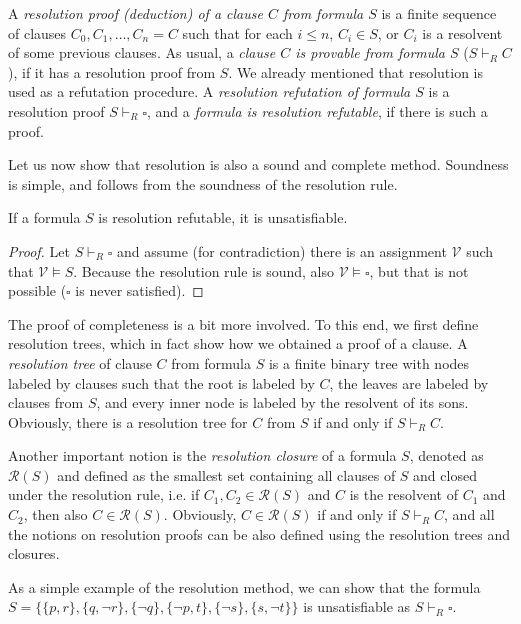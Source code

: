 A \emph{resolution proof (deduction) of a clause $C$ from formula $S$} is a finite sequence of clauses $C_0, C_1, \dots, C_n = C$ such that for each $i \leq n$, $C_i \in S$, or $C_i$ is a resolvent of some previous clauses. As usual, a \emph{clause $C$ is provable from formula $S$} ($S \vdash_R C$), if it has a resolution proof from $S$. We already mentioned that resolution is used as a refutation procedure. A \emph{resolution refutation of formula $S$} is a resolution proof $S \vdash_R \square$, and a \emph{formula is resolution refutable}, if there is such a proof.

Let us now show that resolution is also a sound and complete method. Soundness is simple, and follows from the soundness of the resolution rule.

\begin{theorem}
If a formula $S$ is resolution refutable, it is unsatisfiable.
\end{theorem}
\begin{proof}
Let $S \vdash_R \square$ and assume (for contradiction) there is an assignment $\mathcal{V}$ such that $\mathcal{V} \vDash S$. Because the resolution rule is sound, also $\mathcal{V} \vDash \square$, but that is not possible ($\square$ is never satisfied).
\end{proof}

The proof of completeness is a bit more involved. To this end, we first define resolution trees, which in fact show how we obtained a proof of a clause. A \emph{resolution tree} of clause $C$ from formula $S$ is a finite binary tree with nodes labeled by clauses such that the root is labeled by $C$, the leaves are labeled by clauses from $S$, and every inner node is labeled by the resolvent of its sons. Obviously, there is a resolution tree for $C$ from $S$ if and only if $S \vdash_R C$.

Another important notion is the \emph{resolution closure} of a formula $S$, denoted as $\mathcal{R}(S)$ and defined as the smallest set containing all clauses of $S$ and closed under the resolution rule, i.e. if $C_1, C_2 \in \mathcal{R}(S)$ and $C$ is the resolvent of $C_1$ and $C_2$, then also $C \in \mathcal{R}(S)$. Obviously, $C \in \mathcal{R}(S)$ if and only if $S \vdash_R C$, and all the notions on resolution proofs can be also defined using the resolution trees and closures.

As a simple example of the resolution method, we can show that the formula $S = \{\{p, r\}, \{q, \neg r\}, \{\neg q\}, \{\neg p, t\}, \{\neg s\}, \{s, \neg t\}\}$ is unsatisfiable as $S \vdash_R \square$.


